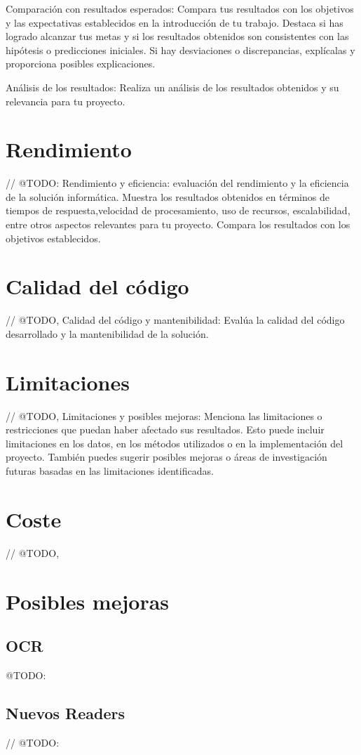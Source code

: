 Comparación con resultados esperados: Compara tus resultados con los objetivos
y las expectativas establecidos en la introducción de tu trabajo.
Destaca si has logrado alcanzar tus metas y si los resultados obtenidos son consistentes con las hipótesis o
predicciones iniciales.
Si hay desviaciones o discrepancias, explícalas y proporciona posibles explicaciones.

Análisis de los resultados: Realiza un análisis de los resultados obtenidos y su relevancia para tu proyecto.


\section{Rendimiento}

// @TODO: Rendimiento y eficiencia: evaluación del rendimiento y la eficiencia de la solución informática.
Muestra los resultados obtenidos en términos de tiempos de respuesta,velocidad de procesamiento, uso de recursos,
escalabilidad, entre otros aspectos relevantes para tu proyecto.
Compara los resultados con los objetivos establecidos.


\section{Calidad del código}

// @TODO, Calidad del código y mantenibilidad:
Evalúa la calidad del código desarrollado y la mantenibilidad de la solución.


\section{Limitaciones}

// @TODO, Limitaciones y posibles mejoras: Menciona las limitaciones o restricciones
que puedan haber afectado sus resultados.
Esto puede incluir limitaciones en los datos, en los métodos utilizados o en la implementación del proyecto.
También puedes sugerir posibles mejoras o áreas de investigación futuras basadas en las limitaciones identificadas.


\section{Coste}
// @TODO,


\section{Posibles mejoras}

\subsection{OCR}
\colorbox{color_highlight}{@TODO:}

\subsection{Nuevos Readers}
// @TODO:
